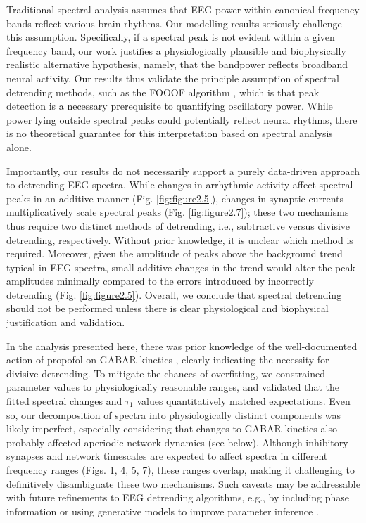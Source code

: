 Traditional spectral analysis assumes that EEG power within canonical frequency bands reflect various brain rhythms. Our modelling results seriously challenge this assumption. Specifically, if a spectral peak is not evident within a given frequency band, our work justifies a physiologically plausible and biophysically realistic alternative hypothesis, namely, that the bandpower reflects broadband neural activity. Our results thus validate the principle assumption of spectral detrending methods, such as the FOOOF algorithm \cite{Donoghue2020}, which is that peak detection is a necessary prerequisite to quantifying oscillatory power. While power lying outside spectral peaks could potentially reflect neural rhythms, there is no theoretical guarantee for this interpretation based on spectral analysis alone. 

Importantly, our results do not necessarily support a purely data-driven approach to detrending EEG spectra. While changes in arrhythmic activity affect spectral peaks in an additive manner (Fig. \ref{fig:figure2.5}), changes in synaptic currents multiplicatively scale spectral peaks (Fig. \ref{fig:figure2.7}); these two mechanisms thus require two distinct methods of detrending, i.e., subtractive versus divisive detrending, respectively. Without prior knowledge, it is unclear which method is required. Moreover, given the amplitude of peaks above the background trend typical in EEG spectra, small additive changes in the trend would alter the peak amplitudes minimally compared to the errors introduced by incorrectly detrending (Fig. \ref{fig:figure2.5}). Overall, we conclude that spectral detrending should not be performed unless there is clear physiological and biophysical justification and validation. 

In the analysis presented here, there was prior knowledge of the well-documented action of propofol on GABAR kinetics \cite{Kitamura2003, Orser1994, Whittington1996}, clearly indicating the necessity for divisive detrending. To mitigate the chances of overfitting, we constrained parameter values to physiologically reasonable ranges, and validated that the fitted spectral changes and $\tau_1$ values quantitatively matched expectations. Even so, our decomposition of spectra into physiologically distinct components was likely imperfect, especially considering that changes to GABAR kinetics also probably affected aperiodic network dynamics \cite{Li2020} (see below). Although inhibitory synapses and network timescales are expected to affect spectra in different frequency ranges (Figs. 1, 4, 5, 7), these ranges overlap, making it challenging to definitively disambiguate these two mechanisms. Such caveats may be addressable with future refinements to EEG detrending algorithms, e.g., by including phase information or using generative models to improve parameter inference \cite{Zeraati2022}. 

